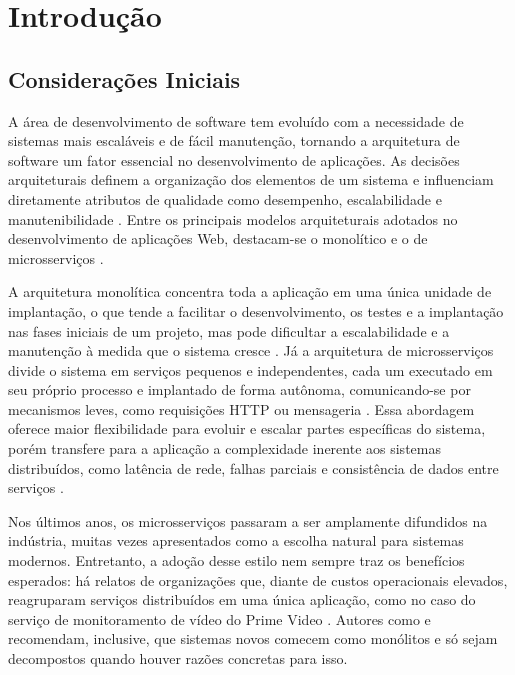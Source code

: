 \chapter{Introdução}

\section{Considerações Iniciais}

A área de desenvolvimento de software tem evoluído com a necessidade de sistemas mais
escaláveis e de fácil manutenção, tornando a arquitetura de software um fator essencial no
desenvolvimento de aplicações. As decisões arquiteturais definem a organização dos elementos
de um sistema e influenciam diretamente atributos de qualidade como desempenho,
escalabilidade e manutenibilidade \cite{bass2021}. Entre os principais modelos arquiteturais
adotados no desenvolvimento de aplicações Web, destacam-se o monolítico e o de microsserviços
\cite{softdesign2020}.

A arquitetura monolítica concentra toda a aplicação em uma única unidade de implantação, o
que tende a facilitar o desenvolvimento, os testes e a implantação nas fases iniciais de um
projeto, mas pode dificultar a escalabilidade e a manutenção à medida que o sistema cresce
\cite{richardson2018}. Já a arquitetura de microsserviços divide o sistema em serviços
pequenos e independentes, cada um executado em seu próprio processo e implantado de forma
autônoma, comunicando-se por mecanismos leves, como requisições HTTP ou mensageria
\cite{lewis2014}. Essa abordagem oferece maior flexibilidade para evoluir e escalar partes
específicas do sistema, porém transfere para a aplicação a complexidade inerente aos sistemas
distribuídos, como latência de rede, falhas parciais e consistência de dados entre serviços
\cite{newman2021}.

Nos últimos anos, os microsserviços passaram a ser amplamente difundidos na indústria, muitas
vezes apresentados como a escolha natural para sistemas modernos. Entretanto, a adoção desse
estilo nem sempre traz os benefícios esperados: há relatos de organizações que, diante de
custos operacionais elevados, reagruparam serviços distribuídos em uma única aplicação, como
no caso do serviço de monitoramento de vídeo do Prime Video \cite{kolny2023}. Autores como
 e  recomendam, inclusive, que sistemas novos
comecem como monólitos e só sejam decompostos quando houver razões concretas para isso.

